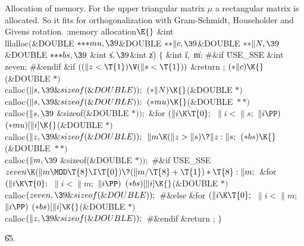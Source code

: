 Allocation of memory. For the upper triangular matrix $\mu$ a
rectangular matrix is allocated. So it fits for orthogonalization with
Gram-Schmidt, Householder and Givens rotation.
\Y\B\4:memory allocation\X${}\E{}$\6
\&{int} \\{lllalloc}(\&{DOUBLE} ${}{*}{*}{*}\\{mu},\39{}$\&{DOUBLE} ${}{*}{*}%
\|c,\39{}$\&{DOUBLE} ${}{*}{*}\|N,\39{}$\&{DOUBLE} ${}{*}{*}{*}\\{bs},\39{}$%
\&{int} \|s${},\39{}$\&{int} \|z)\7
${}\{{}$\1\6
\&{int} \|i${},{}$ \|m;\6
\8\#\&{if} \.{USE\_SSE}\6
\&{int} \\{zeven};\6
\8\#\&{endif}\7
\&{if} ${}((\|z<\T{1})\V(\|s<\T{1})){}$\1\5
\&{return} ;\2\6
${}({*}\|c)\K{}$(\&{DOUBLE} ${}{*}){}$ \\{calloc}${}(\|s,\39\&{sizeof}(%
\&{DOUBLE}));{}$\6
${}({*}\|N)\K{}$(\&{DOUBLE} ${}{*}){}$ \\{calloc}${}(\|s,\39\&{sizeof}(%
\&{DOUBLE}));{}$\6
${}({*}\\{mu})\K{}$(\&{DOUBLE} ${}{*}{*}){}$ \\{calloc}${}(\|s,\39{}$%
\&{sizeof}(\&{DOUBLE} ${}{*}));{}$\6
\&{for} ${}(\|i\K\T{0};{}$ ${}\|i<\|s;{}$ ${}\|i\PP){}$\1\5
${}({*}\\{mu})[\|i]\K{}$(\&{DOUBLE} ${}{*}){}$ \\{calloc}${}(\|z,\39\&{sizeof}(%
\&{DOUBLE}));{}$\2\6
${}\|m\K(\|z>\|s)\?\|z:\|s;{}$\6
${}({*}\\{bs})\K{}$(\&{DOUBLE} ${}{*}{*}){}$ \\{calloc}${}(\|m,\39{}$%
\&{sizeof}(\&{DOUBLE} ${}{*}));{}$\6
\8\#\&{if} \.{USE\_SSE}\6
${}\\{zeven}\K(\|m\MOD\T{8}\I\T{0})\?(\|m/\T{8}+\T{1})*\T{8}:\|m;{}$\6
\&{for} ${}(\|i\K\T{0};{}$ ${}\|i<\|m;{}$ ${}\|i\PP){}$\1\5
${}({*}\\{bs})[\|i]\K{}$(\&{DOUBLE} ${}{*}){}$ \\{calloc}${}(\\{zeven},\39%
\&{sizeof}(\&{DOUBLE}));{}$\2\6
\8\#\&{else}\6
\&{for} ${}(\|i\K\T{0};{}$ ${}\|i<\|m;{}$ ${}\|i\PP){}$\1\5
${}({*}\\{bs})[\|i]\K{}$(\&{DOUBLE} ${}{*}){}$ \\{calloc}${}(\|z,\39\&{sizeof}(%
\&{DOUBLE}));{}$\2\6
\8\#\&{endif}\6
\&{return} ;\6
\4${}\}{}$\2\par
\U65.\fi

